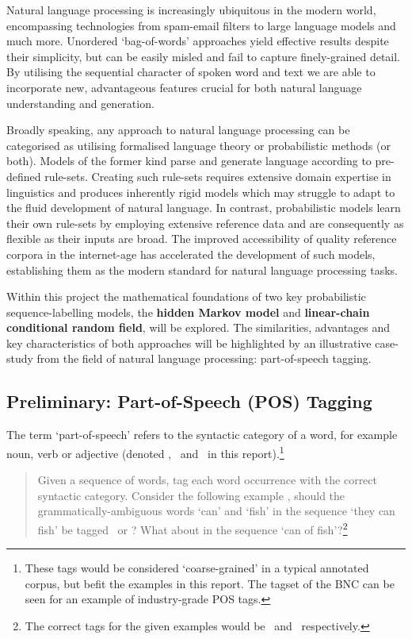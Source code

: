 \documentclass[../main.tex]{subfiles}
\begin{document}
Natural language processing is increasingly ubiquitous in the modern world, encompassing technologies from spam-email filters to large language models and much more.
Unordered `bag-of-words' approaches yield effective results despite their simplicity, but can be easily misled and fail to capture finely-grained detail.
By utilising the sequential character of spoken word and text we are able to incorporate new, advantageous features crucial for both natural language understanding and generation.

Broadly speaking, any approach to natural language processing can be categorised as utilising formalised language theory or probabilistic methods (or both).
Models of the former kind parse and generate language according to pre-defined rule-sets. Creating such rule-sets requires extensive domain expertise in linguistics and produces inherently rigid models which may struggle to adapt to the fluid development of natural language.
In contrast, probabilistic models learn their own rule-sets by employing extensive reference data and are consequently as flexible as their inputs are broad. The improved accessibility of quality reference corpora in the internet-age has accelerated the development of such models, establishing them as the modern standard for natural language processing tasks.

Within this project the mathematical foundations of two key probabilistic sequence-labelling models, the \textbf{hidden Markov model} and \textbf{linear-chain conditional random field}, will be explored.
The similarities, advantages and key characteristics of both approaches will be highlighted by an illustrative case-study from the field of natural language processing: part-of-speech tagging.

\subsection{Preliminary: Part-of-Speech (POS) Tagging}

The term `part-of-speech' refers to the syntactic category of a word, for example noun, verb or adjective (denoted \noun,  \verbsym\ and \adj\ in this report).\footnote{These tags would be considered `coarse-grained' in a typical annotated corpus, but befit the examples in this report. The tagset of the BNC \autocite{bnc-corpus} can be seen for an example of industry-grade POS tags.}

\begin{quote}
    Given a sequence of words, tag each word occurrence with the correct syntactic category. Consider the following example \autocite{eisenstein-nlp-2019}, should the grammatically-ambiguous words `can' and `fish' in the sequence `they can fish' be tagged \noun\ or \verbsym ? What about in the sequence `can of fish'?\footnote{The correct tags for the given examples would be \verbsym \verbsym\ and \noun \noun\ respectively.}
\end{quote}
\end{document}
